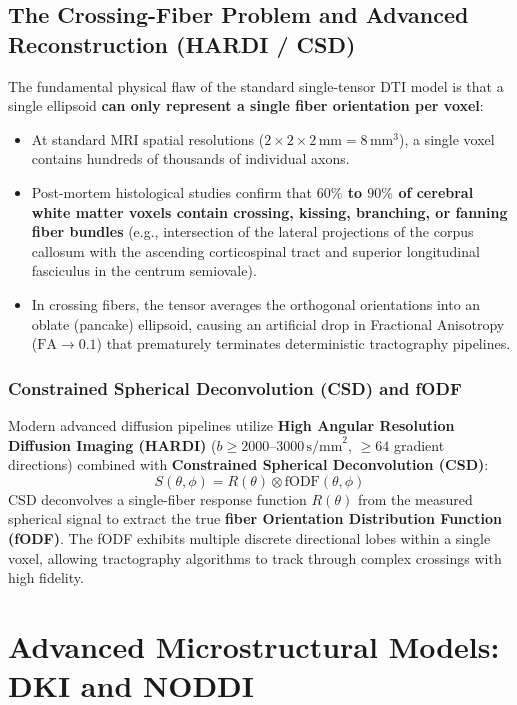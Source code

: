 \documentclass[11pt,a4paper]{article}
\begin{document}
\subsection{The Crossing-Fiber Problem and Advanced Reconstruction (HARDI / CSD)}

The fundamental physical flaw of the standard single-tensor DTI model is that a single ellipsoid \textbf{can only represent a single fiber orientation per voxel}:
\begin{itemize}[leftmargin=*]
    \item At standard MRI spatial resolutions ($2 \times 2 \times 2\,\text{mm} = 8\,\text{mm}^3$), a single voxel contains hundreds of thousands of individual axons.
    \item Post-mortem histological studies confirm that \textbf{$60\%$ to $90\%$ of cerebral white matter voxels contain crossing, kissing, branching, or fanning fiber bundles} (e.g., intersection of the lateral projections of the corpus callosum with the ascending corticospinal tract and superior longitudinal fasciculus in the centrum semiovale).
    \item In crossing fibers, the tensor averages the orthogonal orientations into an oblate (pancake) ellipsoid, causing an artificial drop in Fractional Anisotropy ($\text{FA} \to 0.1$) that prematurely terminates deterministic tractography pipelines.
\end{itemize}

\subsubsection{Constrained Spherical Deconvolution (CSD) and fODF}
Modern advanced diffusion pipelines utilize \textbf{High Angular Resolution Diffusion Imaging (HARDI)} ($b \ge 2000\text{--}3000\,\text{s/mm}^2$, $\ge 64$ gradient directions) combined with \textbf{Constrained Spherical Deconvolution (CSD)}:
\begin{equation}
    S(\theta, \phi) = R(\theta) \otimes \text{fODF}(\theta, \phi)
\end{equation}
CSD deconvolves a single-fiber response function $R(\theta)$ from the measured spherical signal to extract the true \textbf{fiber Orientation Distribution Function (fODF)}. The fODF exhibits multiple discrete directional lobes within a single voxel, allowing tractography algorithms to track through complex crossings with high fidelity.

\newpage
\section{Advanced Microstructural Models: DKI and NODDI}
\end{document}
